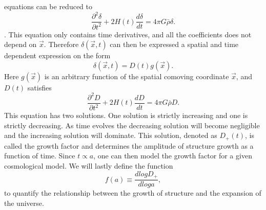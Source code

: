 equations can be reduced to 
\begin{equation}
    \frac{\partial^2 \delta}{\partial t^2} + 2H(t) \frac{d \delta}{dt}=4\pi G\bar{\rho}\delta.
\end{equation}
\cite[p.~345]{schneider2006extragalactic}. This equation only contains time derivatives, and all the coefficients does not
depend on $\vec{x}$. Therefore $\delta(\vec{x}, t)$ can then be expressed a spatial and time
dependent expression on the form 
\begin{equation}
    \delta(\vec{x}, t) = D(t)g(\vec{x}).
\end{equation}
Here $g(\vec{x})$ is an arbitrary function of the spatial comoving coordinate
$\vec{x}$, and $D(t)$ satisfies
\begin{equation}
    \frac{\partial^2 D}{\partial t^2} + 2H(t) \frac{d D}{dt}=4\pi G\bar{\rho}D.
\end{equation}
This equation has two solutions. One solution is strictly increasing and one is
strictly decreasing. As time evolves the decreasing solution will become negligible
and the increasing solution will dominate. This solution, denoted as $D_+(t)$,
is called the growth factor and determines the amplitude of structure growth as
a function of time. Since $t\propto a$, one can then model the growth factor for
a given cosmological model. We will lastly define the function
\begin{equation}\label{eq:growthfac}
    f(a) \equiv \frac{d log D_+}{d log a},
\end{equation}
to quantify the relationship between the growth of structure and the expansion
of the universe.
